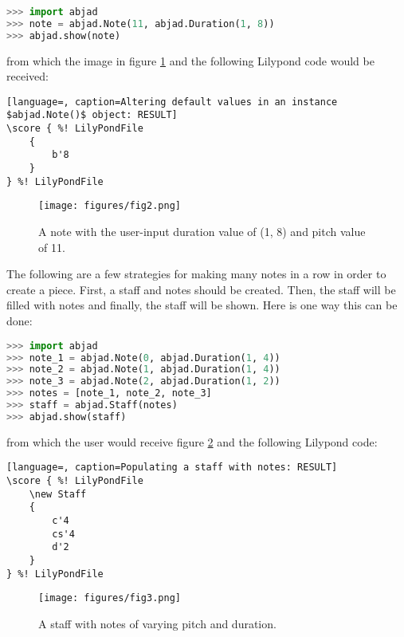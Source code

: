 \singlespace
\begin{lstlisting}[language=Python, caption=Altering default values in an instance $abjad.Note()$ object]
>>> import abjad
>>> note = abjad.Note(11, abjad.Duration(1, 8))
>>> abjad.show(note)
\end{lstlisting}
\doublespace

from which the image in figure \ref{fig:b_natural} and the following Lilypond code would be received:

\singlespace
\begin{lstlisting}[language=, caption=Altering default values in an instance $abjad.Note()$ object: RESULT]
\score { %! LilyPondFile
    {
        b'8
    }
} %! LilyPondFile
\end{lstlisting}
\doublespace

\singlespace
\begin{figure}[h]
  \texttt{[image: figures/fig2.png]}
  \caption{A note with the user-input duration value of (1, 8) and pitch value of 11.}
  \label{fig:b_natural}
\end{figure}
\doublespace

The following are a few strategies for making many notes in a row in order to create a piece. First, a staff and notes should be created. Then, the staff will be filled with notes and finally, the staff will be shown. Here is one way this can be done:

\singlespace
\begin{lstlisting}[language=Python, caption=Populating a staff with notes]
>>> import abjad
>>> note_1 = abjad.Note(0, abjad.Duration(1, 4))
>>> note_2 = abjad.Note(1, abjad.Duration(1, 4))
>>> note_3 = abjad.Note(2, abjad.Duration(1, 2))
>>> notes = [note_1, note_2, note_3]
>>> staff = abjad.Staff(notes)
>>> abjad.show(staff)
\end{lstlisting}
\doublespace

from which the user would receive figure \ref{fig:staff_with_pitches} and the following Lilypond code:

\singlespace
\begin{lstlisting}[language=, caption=Populating a staff with notes: RESULT]
\score { %! LilyPondFile
    \new Staff
    {
        c'4
        cs'4
        d'2
    }
} %! LilyPondFile
\end{lstlisting}
\doublespace

\singlespace
\begin{figure}[h]
  \texttt{[image: figures/fig3.png]}
  \caption{A staff with notes of varying pitch and duration.}
  \label{fig:staff_with_pitches}
\end{figure}
\doublespace

